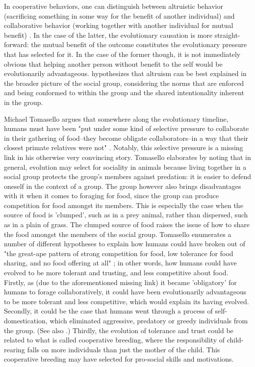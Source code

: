 
In cooperative behaviors, one can distinguish between altruistic behavior (sacrificing something in some way for the benefit of another individual) and collaborative behavior (working together with another individual for mutual benefit) \citep{Tomasello09}. In the case of the latter, the evolutionary causation is more straight-forward: the mutual benefit of the outcome constitutes the evolutionary pressure that has selected for it. In the case of the former though, it is not immediately obvious that helping another person without benefit to the self would be evolutionarily advantageous. 
\citet{Tomasello09} hypothesizes that altruism can be best explained in the broader picture of the social group, considering the norms that are enforced and being conformed to within the group and the shared intentionality inherent in the group.

Michael Tomasello argues that somewhere along the evolutionary timeline, humans must have been "put under some kind of selective pressure to collaborate in their gathering of food--they become obligate collaborators--in a way that their closest primate relatives were not" \citep[p.~75]{Tomasello09}. Notably, this selective pressure is a missing link in his otherwise very convincing story.
Tomasello elaborates by noting that in general, evolution may select for sociality in animals because living together in a social group protects the group's members against predation: it is easier to defend oneself in the context of a group. The group however also brings disadvantages with it when it comes to foraging for food, since the group can produce competition for food amongst its members. This is especially the case when the source of food is 'clumped', such as in a prey animal, rather than dispersed, such as in a plain of grass. The clumped source of food raises the issue of how to share the food amongst the members of the social group.
Tomasello enumerates a number of different hypotheses to explain how humans could have broken out of "the great-ape pattern of strong competition for food, low tolerance for food sharing, and no food offering at all" \citep[p.~83]{Tomasello09}; in other words, how humans could have evolved to be more tolerant and trusting, and less competitive about food.
Firstly, as (due to the aforementioned missing link) it became 'obligatory' for humans to forage collaboratively, it could have been evolutionarily advantageous to be more tolerant and less competitive, which would explain its having evolved.
Secondly, it could be the case that humans went through a process of self-domestication, which eliminated aggressive, predatory or greedy individuals from the group. (See also \citet{Benitez21}.)
Thirdly, the evolution of tolerance and trust could be related to what is called cooperative breeding, where the responsibility of child-rearing falls on more individuals than just the mother of the child. This cooperative breeding may have selected for pro-social skills and motivations.

